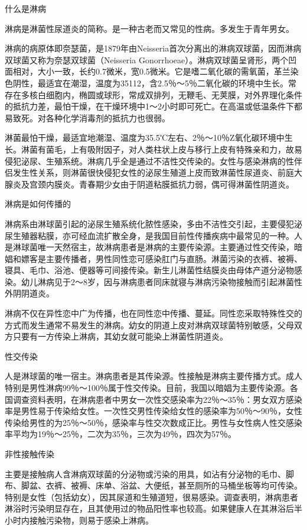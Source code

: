 \documentclass[12pt,UTF8,openany]{ctexbook}
\begin{document}
什么是淋病


淋病是淋菌性尿道炎的简称。是一种古老而又常见的性病。多发生于青年男女。

淋病的病原体即奈瑟菌，是1879年由Neisseria首次分离出的淋病双球菌，因而淋病双球菌又称为奈瑟双球菌（Neisseria Gonorrhoeae）。淋病双球菌呈肾形，两个凹面相对，大小一致，长约0.7微米，宽0.5微米。它是嗜二氧化碳的需氧菌，革兰染色阴性，最适宜在潮湿，温度为35112，含2.5％～5％二氧化碳的环境中生长。常存在多核白细胞内，椭圆或球形，常成双排列，无鞭毛、无荚膜，对外界理化条件的抵抗力差，最怕干燥，在干燥环境中1～2小时即可死亡。在高温或低温条件下都易致死。对各种化学消毒剂的抵抗力也很弱。

淋菌最怕干燥，最适宜地潮湿、温度为35.5℃左右、2％～10％Z氧化碳环境中生长。淋菌有菌毛，上有吸附因子，对人类柱状上皮与移行上皮有特殊亲和力，故易侵犯泌尿、生殖系统。淋病几乎全是通过不洁性交传染的。女性与感染淋病的性伴侣发生性关系，则淋菌很快侵犯女性的泌尿生殖道上皮而致淋菌性尿道炎、前庭大腺炎及宫颈内膜炎。青春期少女由于阴道粘膜抵抗力弱，偶可得淋菌性阴道炎。





淋病是如何传播的


淋病系由淋球菌引起的泌尿生殖系统化脓性感染，多由不洁性交引起，主要侵犯泌尿生殖器粘膜，亦可经血流扩散全身，是我国目前性传播疾病中最常见的一种。人是淋球菌唯一天然宿主，故淋病患者是淋病的主要传染源。主要通过性交传染，暗娼和嫖客是主要传播者，男性同性恋可感染肛门与直肠。淋菌污染的衣裤、被褥、寝具、毛巾、浴池、便器等可间接传染。新生儿淋菌性结膜炎由母体产道分泌物感染。幼儿淋病见于2～8岁，因与淋病患者同床就寝与淋病污染物接触而引起淋菌性外阴阴道炎。

淋病不仅在异性恋中广为传播，也在同性恋中传播、蔓延。同性恋采取特殊性交的方式而发生通常不易发生的淋病。幼女的阴道上皮对淋病双球菌特别敏感，父母双方只要有一方传染上淋病，其幼女就可能染上淋菌性阴道炎。

性交传染

人是淋球菌的唯一宿主。淋病患者是其传染源。性接触是淋病主要传播方式。成人特别是男性淋病99％～100％属于性交传染。目前，我国以暗娼为主要传染源。各国调查资料表明，在淋病患者中男女一次性交感染率为22％～35％：男女双方感染率是男性易于传染给女性。一次性交男性传染给女性的感染率为50％～90％，女性传染给男性的为25％～50％，感染率与性交次数成正比。男性与女性病人性交感染率平均为19％～25％，二次为35％，三次为49％，四次为57％。

非性接触传染

主要是接触病人含淋病双球菌的分泌物或污染的用具，如沾有分泌物的毛巾、脚布、脚盆、衣裤、被褥、床单、浴盆、大便纸，甚至厕所的马桶坐板等均可传染。特别是女性（包括幼女），因其尿道和生殖道短，很易感染。调查表明，淋病患者淋浴时污染明显存在，且其使用过的物品阳性率也较高。如果健康人在其淋浴后半小时内接触污染物，则易于感染上淋病。
\end{document}
